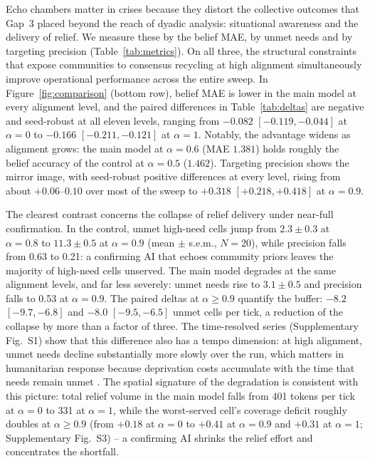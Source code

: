 \documentclass[pdflatex,sn-nature]{sn-jnl}
\begin{document}
Echo chambers matter in crises because they distort the collective outcomes that Gap~3 placed beyond the reach of dyadic analysis: situational awareness and the delivery of relief. We measure these by the belief MAE, by unmet needs and by targeting precision (Table~\ref{tab:metrics}). On all three, the structural constraints that expose communities to consensus recycling at high alignment simultaneously improve operational performance across the entire sweep. In Figure~\ref{fig:comparison} (bottom row), belief MAE is lower in the main model at every alignment level, and the paired differences in Table~\ref{tab:deltas} are negative and seed-robust at all eleven levels, ranging from $-0.082$ $[-0.119, -0.044]$ at $\alpha = 0$ to $-0.166$ $[-0.211, -0.121]$ at $\alpha = 1$. Notably, the advantage widens as alignment grows: the main model at $\alpha = 0.6$ (MAE $1.381$) holds roughly the belief accuracy of the control at $\alpha = 0.5$ ($1.462$). Targeting precision shows the mirror image, with seed-robust positive differences at every level, rising from about $+0.06$--$0.10$ over most of the sweep to $+0.318$ $[+0.218, +0.418]$ at $\alpha = 0.9$.

The clearest contrast concerns the collapse of relief delivery under near-full confirmation. In the control, unmet high-need cells jump from $2.3 \pm 0.3$ at $\alpha = 0.8$ to $11.3 \pm 0.5$ at $\alpha = 0.9$ (mean $\pm$ s.e.m., $N = 20$), while precision falls from 0.63 to 0.21: a confirming AI that echoes community priors leaves the majority of high-need cells unserved. The main model degrades at the same alignment levels, and far less severely: unmet needs rise to $3.1 \pm 0.5$ and precision falls to 0.53 at $\alpha = 0.9$. The paired deltas at $\alpha \geq 0.9$ quantify the buffer: $-8.2$ $[-9.7, -6.8]$ and $-8.0$ $[-9.5, -6.5]$ unmet cells per tick, a reduction of the collapse by more than a factor of three. The time-resolved series (Supplementary Fig.~S1) show that this difference also has a tempo dimension: at high alignment, unmet needs decline substantially more slowly over the run, which matters in humanitarian response because deprivation costs accumulate with the time that needs remain unmet \citep{holguin2012unique}. The spatial signature of the degradation is consistent with this picture: total relief volume in the main model falls from 401 tokens per tick at $\alpha = 0$ to 331 at $\alpha = 1$, while the worst-served cell's coverage deficit roughly doubles at $\alpha \geq 0.9$ (from $+0.18$ at $\alpha = 0$ to $+0.41$ at $\alpha = 0.9$ and $+0.31$ at $\alpha = 1$; Supplementary Fig.~S3) -- a confirming AI shrinks the relief effort and concentrates the shortfall.
\end{document}
